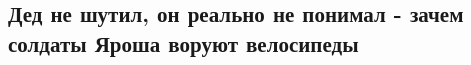  
 
 
 
 

\subsection{Дед не шутил, он реально не понимал - зачем солдаты Яроша воруют велосипеды}
\label{sec:17_12_2019.fb.lashkevich_irina.1.jarosh_2014_lisaped}

